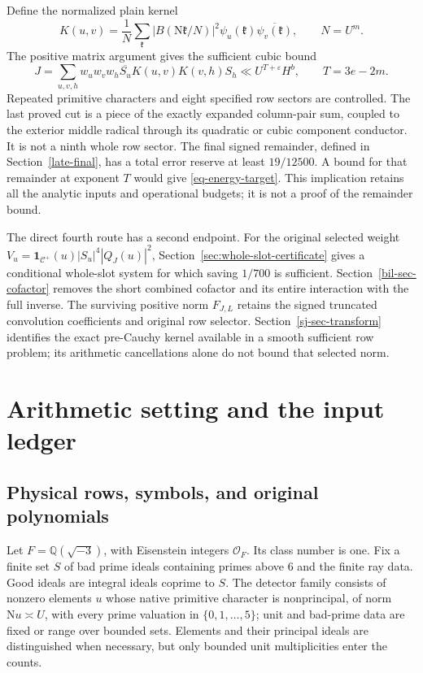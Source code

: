 \documentclass[11pt]{article}
\theoremstyle{definition}
\newcommand{\N}{\mathrm N}
\newcommand{\eps}{\varepsilon}
\newcommand{\Id}{\mathbf 1}
\newcommand{\Cplus}{\mathcal C^+}
\begin{document}
Define the normalized plain kernel
\[
 K(u,v)=\frac1N\sum_{\mathfrak k}
 |B(\N\mathfrak k/N)|^2\psi_u(\mathfrak k)
 \overline{\psi_v(\mathfrak k)},\qquad N=U^m.
\]
The positive matrix argument gives the sufficient cubic bound
\begin{equation}\label{eq-probe-target-intro}
 J=\sum_{u,v,h}w_uw_vw_h\overline{S_u}
 K(u,v)K(v,h)S_h\ll U^{T+\eps}H^b,
 \qquad T=3e-2m.
\end{equation}
Repeated primitive characters and eight specified row sectors are controlled. The last proved cut is a piece of the exactly expanded column-pair sum, coupled to the exterior middle radical through its quadratic or cubic component conductor. It is not a ninth whole row sector. The final signed remainder, defined in Section~\ref{late-final}, has a total error reserve at least $19/12500$. A bound for that remainder at exponent $T$ would give \eqref{eq-energy-target}. This implication retains all the analytic inputs and operational budgets; it is not a proof of the remainder bound.

The direct fourth route has a second endpoint. For the original selected weight $V_u=\Id_{\Cplus}(u)|S_u|^4|Q_J(u)|^2$, Section~\ref{sec:whole-slot-certificate} gives a conditional whole-slot system for which saving $1/700$ is sufficient. Section~\ref{bil-sec-cofactor} removes the short combined cofactor and its entire interaction with the full inverse. The surviving positive norm $F_{J,L}$ retains the signed truncated convolution coefficients and original row selector. Section~\ref{sj-sec-transform} identifies the exact pre-Cauchy kernel available in a smooth sufficient row problem; its arithmetic cancellations alone do not bound that selected norm.

\section{Arithmetic setting and the input ledger}\label{sec-setting}
\subsection{Physical rows, symbols, and original polynomials}
Let $F=\mathbb Q(\sqrt{-3})$, with Eisenstein integers $\mathcal O_F$. Its class number is one. Fix a finite set $S$ of bad prime ideals containing primes above $6$ and the finite ray data. Good ideals are integral ideals coprime to $S$. The detector family consists of nonzero elements $u$ whose native primitive character is nonprincipal, of norm $\N u\asymp U$, with every prime valuation in $\{0,1,\ldots,5\}$; unit and bad-prime data are fixed or range over bounded sets. Elements and their principal ideals are distinguished when necessary, but only bounded unit multiplicities enter the counts.
\end{document}
